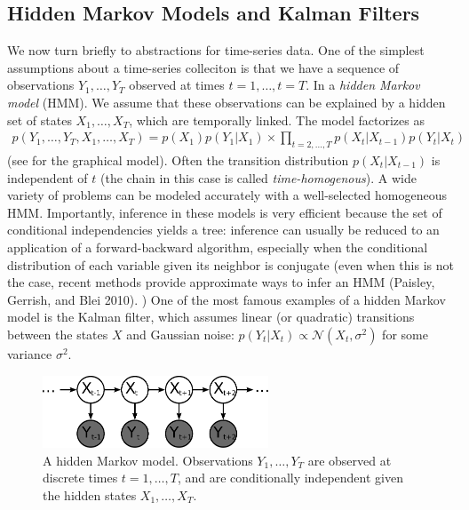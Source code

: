 
\subsection{Hidden Markov Models and Kalman Filters}
We now turn briefly to abstractions for time-series data. One of the
simplest assumptions about a time-series colleciton is that we have a
sequence of observations $Y_1, \ldots, Y_T$ observed at times $t=1,
\ldots, t=T$.  In a \emph{hidden Markov model} (HMM).  We assume that
these observations can be explained by a hidden set of states $X_1,
\ldots, X_T$, which are temporally linked.  The model factorizes as
\begin{align}
  p(Y_1, \ldots, Y_T, X_1, \ldots, X_T) = p(X_1) p(Y_1 | X_1) \times \prod_{t=2, \ldots, T} p(X_t | X_{t-1}) p(Y_t | X_t)
\end{align}
(see  for the graphical model).  Often the transition
distribution $p(X_t | X_{t-1})$ is independent of $t$ (the chain in
this case is called \emph{time-homogenous}).  A wide variety of
problems can be modeled accurately with a well-selected homogeneous
HMM.  Importantly, inference in these models is very efficient because
the set of conditional independencies yields a tree: inference can
usually be reduced to an application of a forward-backward algorithm,
especially when the conditional distribution of each variable given
its neighbor is conjugate (even when this is not the case, recent
methods provide approximate ways to infer an HMM (Paisley, Gerrish,
and Blei 2010).
\nocite{paisley:2010})
One of the most famous examples of a hidden Markov model is the Kalman
filter, which assumes linear (or quadratic) transitions between the
states $X$ and Gaussian noise: $p(Y_t | X_t) \propto \mathcal{N}(X_t,
\sigma^2)$ for some variance $\sigma^2$.
\begin{figure}
  \begin{center}
  \includegraphics[width=0.6\textwidth]{chapter_introductory_material/figs/hmm_gm.pdf}
  \end{center}
  \caption{A hidden Markov model.  Observations $Y_1, \ldots, Y_T$ are observed at discrete times $t=1, \ldots, T$, and are conditionally independent given the hidden states $X_1, \ldots, X_T$.}
  \label{fig:hmm_gm}
\end{figure}

